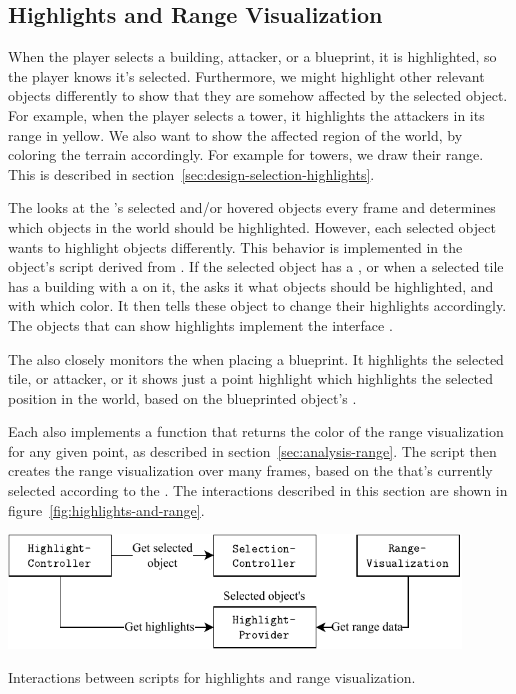 \subsection{Highlights and Range Visualization}\label{sec:docs-highlights}

When the player selects a building, attacker, or a blueprint, it is highlighted, so the player knows it's selected.
Furthermore, we might highlight other relevant objects differently to show that they are somehow affected by the selected object.
For example, when the player selects a tower, it highlights the attackers in its range in yellow.
We also want to show the affected region of the world, by coloring the terrain accordingly.
For example for towers, we draw their range.
This is described in section~\ref{sec:design-selection-highlights}.

The  looks at the 's selected and/or hovered objects every frame and determines which objects in the world should be highlighted.
However, each selected object wants to highlight objects differently.
This behavior is implemented in the object's script derived from .
If the selected object has a , or when a selected tile has a building with a  on it, the  asks it what objects should be highlighted, and with which color.
It then tells these object to change their highlights accordingly.
The objects that can show highlights implement the interface .

The  also closely monitors the  when placing a blueprint.
It highlights the selected tile, or attacker, or it shows just a point highlight which highlights the selected position in the world, based on the blueprinted object's .

Each  also implements a function that returns the color of the range visualization for any given point, as described in section~\ref{sec:analysis-range}.
The script  then creates the range visualization over many frames, based on the  that's currently selected according to the .
The interactions described in this section are shown in figure~\ref{fig:highlights-and-range}.

\begin{center}
    \captionsetup{type=figure}
    \includegraphics[width=0.9\textwidth]{img/higlights and range.pdf}
    \caption{Interactions between scripts for highlights and range visualization.}
    \label{fig:highlights-and-range}
\end{center}

